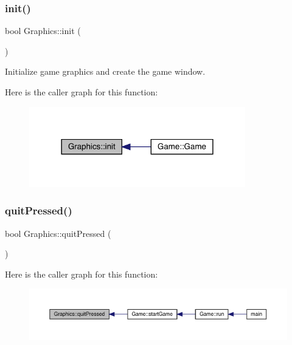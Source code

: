 \subsubsection{\texorpdfstring{init()}{init()}}
{\footnotesize\ttfamily bool Graphics\+::init (\begin{DoxyParamCaption}{ }\end{DoxyParamCaption})}



Initialize game graphics and create the game window. 

Here is the caller graph for this function\+:\nopagebreak
\begin{figure}[H]
\begin{center}
\leavevmode
\includegraphics[width=266pt]{class_graphics_a64b5764b2dbef1b6df23ce18b1a918a1_icgraph}
\end{center}
\end{figure}
\mbox{\label{class_graphics_ad6339f656cf977c3a0cdd8688c672125}} 
\subsubsection{\texorpdfstring{quit\+Pressed()}{quitPressed()}}
{\footnotesize\ttfamily bool Graphics\+::quit\+Pressed (\begin{DoxyParamCaption}{ }\end{DoxyParamCaption})}

Here is the caller graph for this function\+:\nopagebreak
\begin{figure}[H]
\begin{center}
\leavevmode
\includegraphics[width=350pt]{class_graphics_ad6339f656cf977c3a0cdd8688c672125_icgraph}
\end{center}
\end{figure}
\mbox{\label{class_graphics_aedd2af95b26f8b2077e266f692818ea2}} 
